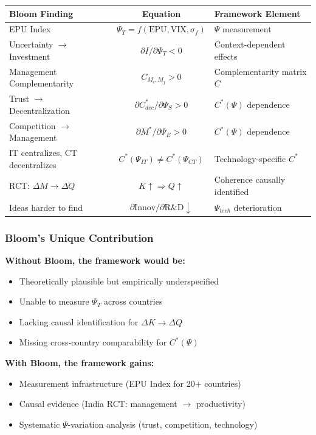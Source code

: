 \begin{center}
\renewcommand{\arraystretch}{1.5}
\begin{tabular}{|l|c|l|}
\hline
\textbf{Bloom Finding} & \textbf{Equation} & \textbf{Framework Element} \\
\hline
EPU Index & $\Psi_T = f(\text{EPU}, \text{VIX}, \sigma_f)$ & $\Psi$ measurement \\
\hline
Uncertainty $\to$ Investment & $\partial I / \partial \Psi_T < 0$ & Context-dependent effects \\
\hline
Management Complementarity & $C_{M_i, M_j} > 0$ & Complementarity matrix $C$ \\
\hline
Trust $\to$ Decentralization & $\partial C^*_{dec} / \partial \Psi_S > 0$ & $C^*(\Psi)$ dependence \\
\hline
Competition $\to$ Management & $\partial M^* / \partial \Psi_E > 0$ & $C^*(\Psi)$ dependence \\
\hline
IT centralizes, CT decentralizes & $C^*(\Psi_{IT}) \neq C^*(\Psi_{CT})$ & Technology-specific $C^*$ \\
\hline
RCT: $\Delta M \to \Delta Q$ & $K \uparrow \Rightarrow Q \uparrow$ & Coherence causally identified \\
\hline
Ideas harder to find & $\partial \text{Innov}/\partial \text{R\&D} \downarrow$ & $\Psi_{tech}$ deterioration \\
\hline
\end{tabular}
\end{center}

\subsubsection{Bloom's Unique Contribution}

\textbf{Without Bloom, the framework would be:}
\begin{itemize}
    \item Theoretically plausible but empirically underspecified
    \item Unable to measure $\Psi_T$ across countries
    \item Lacking causal identification for $\Delta K \to \Delta Q$
    \item Missing cross-country comparability for $C^*(\Psi)$
\end{itemize}

\textbf{With Bloom, the framework gains:}
\begin{itemize}
    \item Measurement infrastructure (EPU Index for 20+ countries)
    \item Causal evidence (India RCT: management $\to$ productivity)
    \item Systematic $\Psi$-variation analysis (trust, competition, technology)
\end{itemize}

